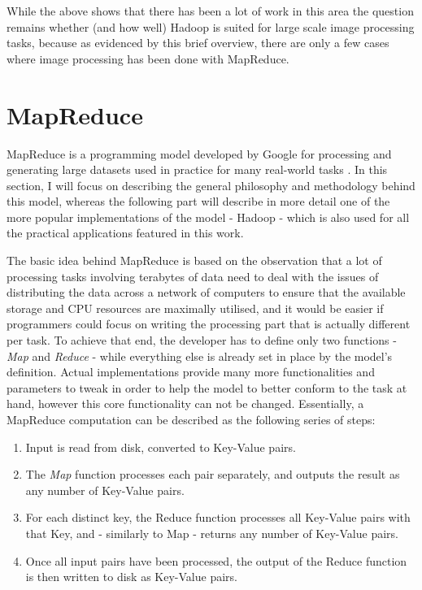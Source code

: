 \documentclass [12pt,a4paper]{report}
\begin{document}
While the above shows that there has been a lot of work in this area the question remains whether (and how well) Hadoop is suited for large scale image processing tasks, because as evidenced by this brief overview, there are only a few cases where image processing has been done with MapReduce. 


\section{MapReduce}

MapReduce is a programming model developed by Google for processing and generating large datasets used in practice for many real-world tasks \cite{Dean:2008:MSD:1327452.1327492}. In this section, I will focus on describing the general philosophy and methodology behind this model, whereas the following part will describe in more detail one of the more popular implementations of the model - Hadoop - which is also used for all the practical applications featured in this work.

The basic idea behind MapReduce is based on the observation that a lot of processing tasks involving terabytes of data need to deal with the issues of distributing the data across a network of computers to ensure that the available storage and CPU resources are maximally utilised, and it would be easier if programmers could focus on writing the processing part that is actually different per task. To achieve that end, the developer has to define only two functions - \textit{Map} and \textit{Reduce} - while everything else is already set in place by the model's definition. Actual implementations provide many more functionalities and parameters to tweak in order to help the model to better conform to the task at hand, however this core functionality can not be changed. Essentially, a MapReduce computation can be described as the following series of steps:

\begin{enumerate}
\item Input is read from disk, converted to Key-Value pairs.
\item The \textit{Map} function processes each pair separately, and outputs the result as any number of Key-Value pairs.
\item For each distinct key, the Reduce function processes all Key-Value pairs with that Key, and - similarly to Map - returns any number of Key-Value pairs.
\item Once all input pairs have been processed, the output of the Reduce function is then written to disk as Key-Value pairs. 
\end{enumerate}
\end{document}
